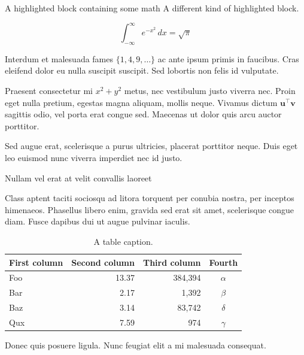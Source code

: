 \begin{columns}[t]
\begin{column}{\colwidth}
\begin{exampleblock}{A highlighted block containing some math}
    A different kind of highlighted block.

    $$
    \int_{-\infty}^{\infty} e^{-x^2}\,dx = \sqrt{\pi}
    $$

    Interdum et malesuada fames $\{1, 4, 9, \ldots\}$ ac ante ipsum primis in
    faucibus. Cras eleifend dolor eu nulla suscipit suscipit. Sed lobortis non
    felis id vulputate.


    Praesent consectetur mi $x^2 + y^2$ metus, nec vestibulum justo viverra
    nec. Proin eget nulla pretium, egestas magna aliquam, mollis neque. Vivamus
    dictum $\mathbf{u}^\intercal\mathbf{v}$ sagittis odio, vel porta erat
    congue sed. Maecenas ut dolor quis arcu auctor porttitor.


    Sed augue erat, scelerisque a purus ultricies, placerat porttitor neque.
    Duis eget leo euismod nunc viverra imperdiet nec id justo.

  \end{exampleblock}

  \begin{block}{Nullam vel erat at velit convallis laoreet}

    Class aptent taciti sociosqu ad litora torquent per conubia nostra, per
    inceptos himenaeos. Phasellus libero enim, gravida sed erat sit amet,
    scelerisque congue diam. Fusce dapibus dui ut augue pulvinar iaculis.

    \begin{table}
      \centering
      \begin{tabular}{l r r c}
        \toprule
        \textbf{First column} & \textbf{Second column} & \textbf{Third column} & \textbf{Fourth} \\
        \midrule
        Foo & 13.37 & 384,394 & $\alpha$ \\
        Bar & 2.17 & 1,392 & $\beta$ \\
        Baz & 3.14 & 83,742 & $\delta$ \\
        Qux & 7.59 & 974 & $\gamma$ \\
        \bottomrule
      \end{tabular}
      \caption{A table caption.}
    \end{table}

    Donec quis posuere ligula. Nunc feugiat elit a mi malesuada consequat.


\end{block}
\end{column}
\end{columns}
